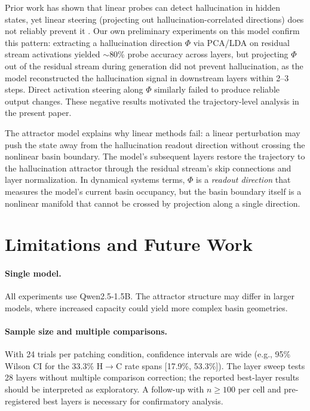 \documentclass[11pt,a4paper]{article}
\begin{document}
Prior work has shown that linear probes can detect hallucination in hidden states, yet linear steering (projecting out hallucination-correlated directions) does not reliably prevent it \cite{li2023inference,zou2023representation}. Our own preliminary experiments on this model confirm this pattern: extracting a hallucination direction $\Phi$ via PCA/LDA on residual stream activations yielded $\sim$80\% probe accuracy across layers, but projecting $\Phi$ out of the residual stream during generation did not prevent hallucination, as the model reconstructed the hallucination signal in downstream layers within 2--3 steps. Direct activation steering along $\Phi$ similarly failed to produce reliable output changes. These negative results motivated the trajectory-level analysis in the present paper.

The attractor model explains why linear methods fail: a linear perturbation may push the state away from the hallucination readout direction without crossing the nonlinear basin boundary. The model's subsequent layers restore the trajectory to the hallucination attractor through the residual stream's skip connections and layer normalization. In dynamical systems terms, $\Phi$ is a \emph{readout direction} that measures the model's current basin occupancy, but the basin boundary itself is a nonlinear manifold that cannot be crossed by projection along a single direction.

\section{Limitations and Future Work}

\paragraph{Single model.} All experiments use Qwen2.5-1.5B. The attractor structure may differ in larger models, where increased capacity could yield more complex basin geometries.

\paragraph{Sample size and multiple comparisons.} With 24 trials per patching condition, confidence intervals are wide (e.g., 95\% Wilson CI for the 33.3\% H$\to$C rate spans [17.9\%, 53.3\%]). The layer sweep tests 28 layers without multiple comparison correction; the reported best-layer results should be interpreted as exploratory. A follow-up with $n \geq 100$ per cell and pre-registered best layers is necessary for confirmatory analysis.
\end{document}

